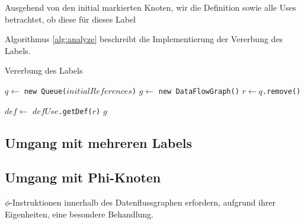 Ausgehend von den initial markierten Knoten, wir die Definition sowie alle Uses betrachtet,
ob diese für dieses Label

Algorithmus \ref{alg:analyze} beschreibt die Implementierung der Vererbung 
des Labels.

\begin{algorithm}[H]
	\caption{Vererbung des Labels}\label{alg:analyze}
	\begin{algorithmic}[1]
		\STATE $q \gets$ \texttt{new Queue($initialReferences$)}
		\STATE $g \gets$ \texttt{new DataFlowGraph()}
			\STATE $r \gets q$\texttt{.remove()}

				\STATE $def \gets$ \texttt{$defUse$.getDef($r$)}
			\ENDIF
		\ENDWHILE
		\RETURN $g$
	\end{algorithmic}
\end{algorithm}

\subsection{Umgang mit mehreren Labels}

\subsection{Umgang mit Phi-Knoten}

$\phi$-Instruktionen innerhalb des Datenflussgraphen erfordern, aufgrund ihrer Eigenheiten,
eine besondere Behandlung.  